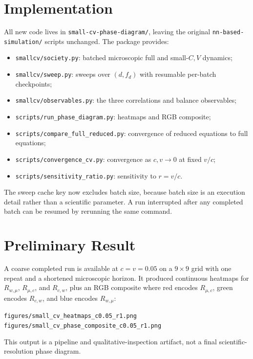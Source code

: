 \documentclass{article}
\newcommand{\Rwm}{R_{w,\mu}}
\newcommand{\Rmc}{R_{\mu,c}}
\newcommand{\Rcw}{R_{c,w}}
\begin{document}
\section{Implementation}

All new code lives in \texttt{small-cv-phase-diagram/}, leaving the original
\texttt{nn-based-simulation/} scripts unchanged.  The package provides:
\begin{itemize}
  \item \texttt{smallcv/society.py}: batched microscopic full and small-$C,V$
  dynamics;
  \item \texttt{smallcv/sweep.py}: sweeps over $(d,f_d)$ with resumable
  per-batch checkpoints;
  \item \texttt{smallcv/observables.py}: the three correlations and balance
  observables;
  \item \texttt{scripts/run\_phase\_diagram.py}: heatmaps and RGB composite;
  \item \texttt{scripts/compare\_full\_reduced.py}: convergence of reduced
  equations to full equations;
  \item \texttt{scripts/convergence\_cv.py}: convergence as $c,v\to0$ at fixed
  $v/c$;
  \item \texttt{scripts/sensitivity\_ratio.py}: sensitivity to $r=v/c$.
\end{itemize}

The sweep cache key now excludes batch size, because batch size is an execution
detail rather than a scientific parameter.  A run interrupted after any
completed batch can be resumed by rerunning the same command.

\section{Preliminary Result}

A coarse completed run is available at $c=v=0.05$ on a $9\times9$ grid with one
repeat and a shortened microscopic horizon.  It produced continuous heatmaps
for $\Rwm$, $\Rmc$, and $\Rcw$, plus an RGB composite where red encodes $\Rmc$,
green encodes $\Rcw$, and blue encodes $\Rwm$:
\begin{center}
{\small\texttt{figures/small\_cv\_heatmaps\_c0.05\_r1.png}}\\
{\small\texttt{figures/small\_cv\_phase\_composite\_c0.05\_r1.png}}
\end{center}
This output is a pipeline and qualitative-inspection artifact, not a final
scientific-resolution phase diagram.
\end{document}
